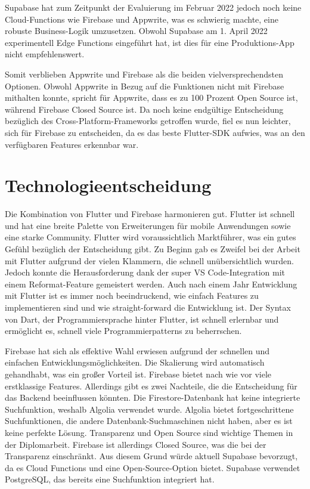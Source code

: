 Supabase hat zum Zeitpunkt der Evaluierung im Februar 2022 jedoch noch keine Cloud-Functions wie Firebase und Appwrite, was es schwierig machte, eine robuste Business-Logik umzusetzen. Obwohl Supabase am 1. April 2022 experimentell Edge Functions eingeführt hat, ist dies für eine Produktions-App nicht empfehlenswert.

Somit verblieben Appwrite und Firebase als die beiden vielversprechendsten Optionen. Obwohl Appwrite in Bezug auf die Funktionen nicht mit Firebase mithalten konnte, spricht für Appwrite, dass es zu 100 Prozent Open Source ist, während Firebase Closed Source ist. Da noch keine endgültige Entscheidung bezüglich des Cross-Platform-Frameworks getroffen wurde, fiel es nun leichter, sich für Firebase zu entscheiden, da es das beste Flutter-SDK aufwies, was an den verfügbaren Features erkennbar war.

\section{Technologieentscheidung}
Die Kombination von Flutter und Firebase harmonieren gut. Flutter ist schnell und hat eine breite Palette von Erweiterungen für mobile Anwendungen sowie eine starke Community. Flutter wird voraussichtlich Marktführer, was ein gutes Gefühl bezüglich der Entscheidung gibt. Zu Beginn gab es Zweifel bei der Arbeit mit Flutter aufgrund der vielen Klammern, die schnell unübersichtlich wurden. Jedoch konnte die Herausforderung dank der super VS Code-Integration mit einem Reformat-Feature gemeistert werden. Auch nach einem Jahr Entwicklung mit Flutter ist es immer noch beeindruckend, wie einfach Features zu implementieren sind und wie straight-forward die Entwicklung ist. Der Syntax von Dart, der Programmiersprache hinter Flutter, ist schnell erlernbar und ermöglicht es, schnell viele Programmierpatterns zu beherrschen.

Firebase hat sich als effektive Wahl erwiesen aufgrund der schnellen und einfachen Entwicklungsmöglichkeiten. Die Skalierung wird automatisch gehandhabt, was ein großer Vorteil ist. Firebase bietet nach wie vor viele erstklassige Features. Allerdings gibt es zwei Nachteile, die die Entscheidung für das Backend beeinflussen könnten. Die Firestore-Datenbank hat keine integrierte Suchfunktion, weshalb Algolia verwendet wurde. Algolia bietet fortgeschrittene Suchfunktionen, die andere Datenbank-Suchmaschinen nicht haben, aber es ist keine perfekte Lösung. Transparenz und Open Source sind wichtige Themen in der Diplomarbeit. Firebase ist allerdings Closed Source, was die bei der Transparenz einschränkt. Aus diesem Grund würde aktuell Supabase bevorzugt, da es Cloud Functions und eine Open-Source-Option bietet. Supabase verwendet PostgreSQL, das bereits eine Suchfunktion integriert hat.
